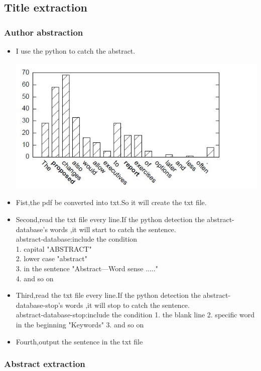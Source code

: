 	
\subsection*{Title extraction}

\subsubsection*{Author abstraction}
\begin{itemize}
	\item I use the python to catch the abstract.
	\begin{center}
		\includegraphics[width=0.8\columnwidth]{Union_Background_Chart_2}
	\end{center}
	\item Fist,the pdf be converted into txt.So it will create the txt file.\\ 
	\item Second,read the txt file every line.If the python detection the abstract-database's words ,it will start to catch the sentence.\\ 	
	abstract-database:include the condition\\
	    1. capital         "ABSTRACT"\\
	    2. lower case      "abstract"\\
	    3. in the sentence "Abstract—Word sense ....."\\
	    4. and so on \\
	\item Third,read the txt file every line.If the python detection the abstract-database-stop's words ,it will stop to catch the sentence.\\ 
    abstract-database-stop:include the condition
    1. the blank line
    2. specific word in the beginning "Keywords"
    3. and so on
	\item Fourth,output the sentence in the txt file\\ 	

\end{itemize}

\subsubsection*{Abstract extraction}

\nwepage
